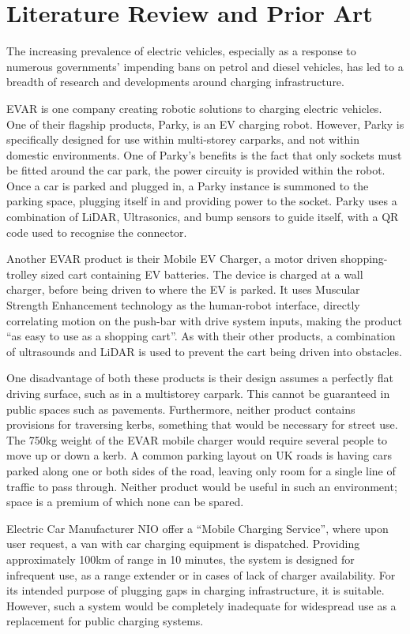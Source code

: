 \documentclass [12pt]{article}
\begin{document}
\newpage
\section{Literature Review and Prior Art}
The increasing prevalence of electric vehicles, especially as a response to numerous governments’ impending bans on petrol and diesel vehicles, has led to a breadth of research and developments around charging infrastructure. 

EVAR is one company creating robotic solutions to charging electric vehicles. One of their flagship products, Parky, is an EV charging robot\cite{EVAR_PARKY}. However, Parky is specifically designed for use within multi-storey carparks, and not within domestic environments. One of Parky’s benefits is the fact that only sockets must be fitted around the car park, the power circuity is provided within the robot. Once a car is parked and plugged in, a Parky instance is summoned to the parking space, plugging itself in and providing power to the socket. Parky uses a combination of LiDAR, Ultrasonics, and bump sensors to guide itself, with a QR code used to recognise the connector.

Another EVAR product is their Mobile EV Charger, a motor driven shopping-trolley sized cart containing EV batteries\cite{EVAR_MOBILE_CHARGER}. The device is charged at a wall charger, before being driven to where the EV is parked. It uses Muscular Strength Enhancement technology as the human-robot interface, directly correlating motion on the push-bar with drive system inputs, making the product “as easy to use as a shopping cart”. As with their other products, a combination of ultrasounds and LiDAR is used to prevent the cart being driven into obstacles. 

One disadvantage of both these products is their design assumes a perfectly flat driving surface, such as in a multistorey carpark. This cannot be guaranteed in public spaces such as pavements. Furthermore, neither product contains provisions for traversing kerbs, something that would be necessary for street use. The 750kg weight of the EVAR mobile charger would require several people to move up or down a kerb. A common parking layout on UK roads is having cars parked along one or both sides of the road, leaving only room for a single line of traffic to pass through. Neither product would be useful in such an environment; space is a premium of which none can be spared.

Electric Car Manufacturer NIO offer a “Mobile Charging Service”, where upon user request, a van with car charging equipment is dispatched\cite{nio-power}. Providing approximately 100km of range in 10 minutes, the system is designed for infrequent use, as a range extender or in cases of lack of charger availability. For its intended purpose of plugging gaps in charging infrastructure, it is suitable. However, such a system would be completely inadequate for widespread use as a replacement for public charging systems.
\end{document}
